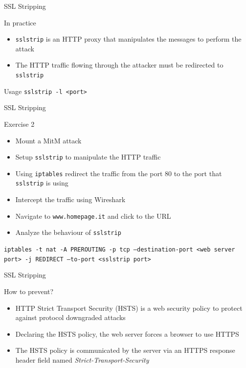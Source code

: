 \documentclass{beamer}
\begin{document}
\begin{frame}{SSL Stripping}
  \begin{block}{In practice}
    \begin{itemize}
      \item \texttt{sslstrip} is an HTTP proxy that manipulates the messages to perform the attack
      \item The HTTP traffic flowing through the attacker must be redirected to \texttt{sslstrip}
    \end{itemize}
  \end{block}
  \begin{block}{Usage}
  \texttt{sslstrip -l <port>}
  \end{block}
\end{frame}
\begin{frame}{SSL Stripping}
  \begin{block}{Exercise 2}
    \begin{itemize}
      \item Mount a MitM attack
      \item Setup \texttt{sslstrip} to manipulate the HTTP traffic
      \item Using \texttt{iptables} redirect the traffic from the port 80 to the port that \texttt{sslstrip} is using
      \item Intercept the traffic using Wireshark
      \item Navigate to \texttt{www.homepage.it} and click to the URL
      \item Analyze the behaviour of \texttt{sslstrip}
    \end{itemize}
  \end{block}
  \pause
  \texttt{iptables -t nat -A PREROUTING -p tcp --destination-port <web server port> -j REDIRECT --to-port <sslstrip port>}

\end{frame}
\begin{frame}{SSL Stripping}
  \begin{block}{How to prevent?}
  \pause
  \begin{itemize}
      \item HTTP Strict Transport Security (HSTS) is a web security policy to protect against protocol downgraded attacks
      \item Declaring the HSTS policy, the web server forces a browser to use HTTPS
      \item The HSTS policy is communicated by the server via an HTTPS response header field named \textit{Strict-Transport-Security}
    \end{itemize}
  \end{block}
\end{frame}
\end{document}
